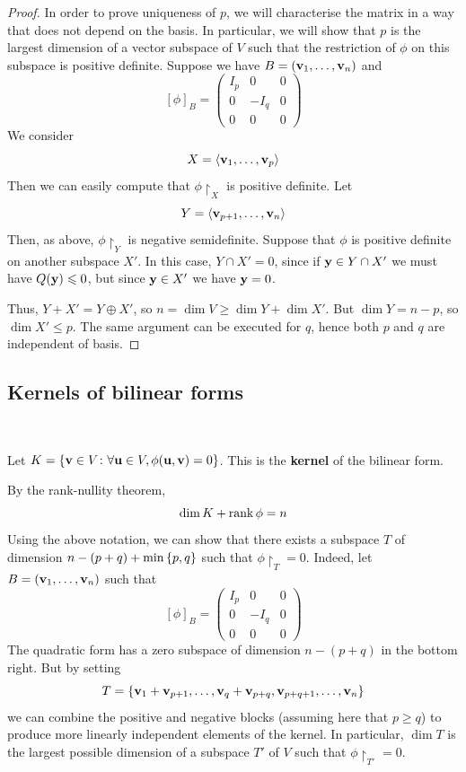 \documentclass[a4paper]{article}
\begin{document}
\begin{proof}
	In order to prove uniqueness of \( p \), we will characterise the matrix in a way that does not depend on the basis.
	In particular, we will show that \( p \) is the largest dimension of a vector subspace of \( V \) such that the restriction of \( \phi \) on this subspace is positive definite.
	Suppose we have \( B = ({\bf v}_1, \dots, {\bf v}_n) \) and
	\[
		[\phi]_B = \begin{pmatrix}
			I_p & 0    & 0 \\
			0   & -I_q & 0 \\
			0   & 0    & 0
		\end{pmatrix}
	\]
	We consider
	\[
		X = \left\langle{} {\bf v}_1, \dots, {\bf v}_p \right\rangle
	\]
	Then we can easily compute that \({\phi}\restriction_X \) is positive definite.
	Let
	\[
		Y = \left\langle{} {\bf v}_{p+1}, \dots, {\bf v}_n \right\rangle
	\]
	Then, as above, \( {\phi}\restriction_Y \) is negative semidefinite.
	Suppose that \( \phi \) is positive definite on another subspace \( X' \).
	In this case, \( Y \cap X' = \qty{0} \), since if \( {\bf y} \in Y \cap X' \) we must have \( Q({\bf y}) \leqslant 0 \), but since \( {\bf y} \in X' \) we have \( {\bf y} = 0 \).

	Thus, \( Y + X' = Y \oplus X' \), so \( n = \dim V \geq \dim Y + \dim X' \).
	But \( \dim Y = n - p \), so \( \dim X' \leq p \).
	The same argument can be executed for \( q \), hence both \( p \) and \( q \) are independent of basis.
\end{proof}

\subsection{Kernels of bilinear forms}
\ \vspace*{-1.5em}
\begin{definition}
	Let \( K = \qty{ {\bf v}\in V \colon \forall {\bf u}\in V, \phi({\bf u},{\bf v}) = 0 } \).
	This is the \textbf{kernel} of the bilinear form.
\end{definition}
\begin{remark}
	By the rank-nullity theorem,
	\[
		\dim K + \rank \phi = n
	\]
	Using the above notation, we can show that there exists a subspace \( T \) of dimension \( n - (p+q) + \min\qty{p,q} \) such that \( {\phi}\restriction_T = 0 \).
	Indeed, let \( B = ({\bf v}_1, \dots, {\bf v}_n) \) such that
	\[
		[\phi]_B = \begin{pmatrix}
			I_p & 0    & 0 \\
			0   & -I_q & 0 \\
			0   & 0    & 0
		\end{pmatrix}
	\]
	The quadratic form has a zero subspace of dimension \( n - (p+q) \) in the bottom right.
	But by setting
	\[
		T = \qty{{\bf v}_1 + {\bf v}_{p+1}, \dots, {\bf v}_q + {\bf v}_{p+q}, {\bf v}_{p+q+1}, \dots, {\bf v}_n}
	\]
	we can combine the positive and negative blocks (assuming here that \( p \geq q \)) to produce more linearly independent elements of the kernel.
	In particular, \( \dim T \) is the largest possible dimension of a subspace \( T' \) of \( V \) such that \( {\phi}\restriction_{T'} = 0 \).
\end{remark}
\end{document}
